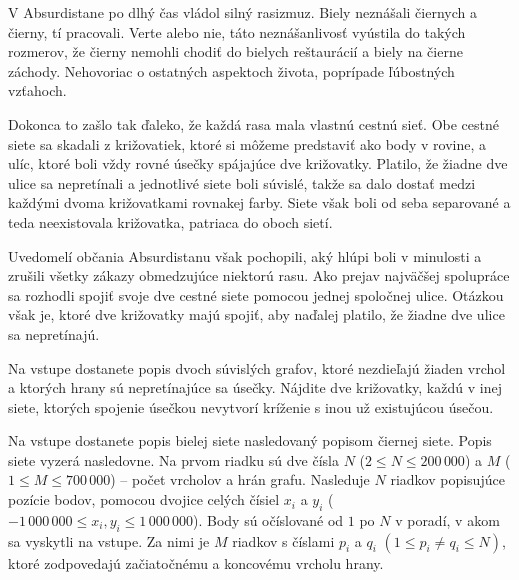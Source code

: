 





V Absurdistane po dlhý čas vládol silný rasizmuz. Biely neznášali čiernych a čierny, tí pracovali.
Verte alebo nie, táto neznášanlivosť vyústila do takých rozmerov, že čierny nemohli chodiť do
bielych reštaurácií a biely na čierne záchody. Nehovoriac o ostatných aspektoch života, poprípade
ľúbostných vzťahoch.

Dokonca to zašlo tak ďaleko, že každá rasa mala vlastnú cestnú sieť. Obe cestné siete sa skadali z
križovatiek, ktoré si môžeme predstaviť ako body v rovine, a ulíc, ktoré boli vždy rovné úsečky
spájajúce dve križovatky. Platilo, že žiadne dve ulice sa nepretínali a jednotlivé siete boli súvislé,
takže sa dalo dostať medzi každými dvoma križovatkami rovnakej farby. Siete však boli od seba
separované a teda neexistovala križovatka, patriaca do oboch sietí.

Uvedomelí občania Absurdistanu však pochopili, aký hlúpi boli v minulosti a zrušili všetky zákazy
obmedzujúce niektorú rasu. Ako prejav najväčšej spolupráce sa rozhodli spojiť svoje dve cestné siete
pomocou jednej spoločnej ulice. Otázkou však je, ktoré dve križovatky majú spojiť, aby naďalej
platilo, že žiadne dve ulice sa nepretínajú.


Na vstupe dostanete popis dvoch súvislých grafov, ktoré nezdieľajú žiaden vrchol a ktorých hrany sú
nepretínajúce sa úsečky. Nájdite dve križovatky, každú v inej siete, ktorých spojenie úsečkou nevytvorí
kríženie s inou už existujúcou úsečou.


Na vstupe dostanete popis bielej siete nasledovaný popisom čiernej siete. Popis siete vyzerá
nasledovne. Na prvom riadku sú dve čísla $N$ ($2 \leq N \leq 200\,000$) a $M$ ($1 \leq M \leq
700\,000$) -- počet vrcholov a hrán grafu. Nasleduje $N$ riadkov popisujúce pozície bodov, pomocou
dvojice celých čísiel $x_i$ a $y_i$ ($-1\,000\,000 \leq x_i,y_i \leq 1\,000\,000$). Body sú
očíslované od $1$ po $N$ v poradí, v akom sa vyskytli na vstupe. Za nimi je $M$
riadkov s číslami $p_i$ a $q_i$ $(1 \leq p_i \neq q_i \leq N)$, ktoré zodpovedajú začiatočnému a
koncovému vrcholu hrany.

